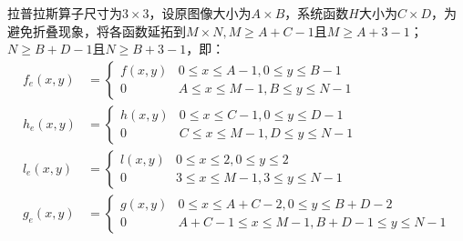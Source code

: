 \documentclass[UTF8]{ctexart}
\begin{document}
    拉普拉斯算子尺寸为$3 \times 3$，设原图像大小为$A \times B$，系统函数$H$大小为$C \times D$，为避免折叠现象，将各函数延拓到$M \times N,M \geq A+C-1$且$M \geq A+3-1$；$N \geq B+D-1$且$N \geq B+3-1$，即：
    \begin{equation}\label{eq1ddef}
    \begin{split}
        f_e(x,y)&=\begin{cases}
            f(x,y) & 0 \leq x \leq A-1,0 \leq y \leq B-1\\0 & A \leq x \leq M-1,B \leq y \leq N-1
        \end{cases}\\
        h_e(x,y)&=\begin{cases}
            h(x,y) & 0 \leq x \leq C-1,0 \leq y \leq D-1\\0 & C \leq x \leq M-1,D \leq y \leq N-1
        \end{cases}\\
        l_e(x,y)&=\begin{cases}
            l(x,y) & 0 \leq x \leq 2,0 \leq y \leq 2\\0 & 3 \leq x \leq M-1,3 \leq y \leq N-1
        \end{cases}\\
        g_e(x,y)&=\begin{cases}
            g(x,y) & 0 \leq x \leq A+C-2,0 \leq y \leq B+D-2\\0 & A+C-1 \leq x \leq M-1,B+D-1 \leq y \leq N-1
        \end{cases}\\
    \end{split}
    \end{equation}
\end{document}

